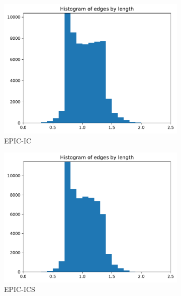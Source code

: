 \documentclass[3p,times,procedia,number]{elsarticle}
\begin{document}
\begin{figure}
\begin{subfigure}{.16\textwidth}
\centering
\includegraphics[width=\textwidth]{epic-ic-cube-linear-length.pdf}
\caption{EPIC-IC}
\end{subfigure}
\begin{subfigure}{.16\textwidth}
\centering
\includegraphics[width=\textwidth]{epic-ics-cube-linear-length.pdf}
\caption{EPIC-ICS}
\end{subfigure}
\begin{subfigure}{.16\textwidth}
\centering

\end{subfigure}
\end{figure}
\end{document}
